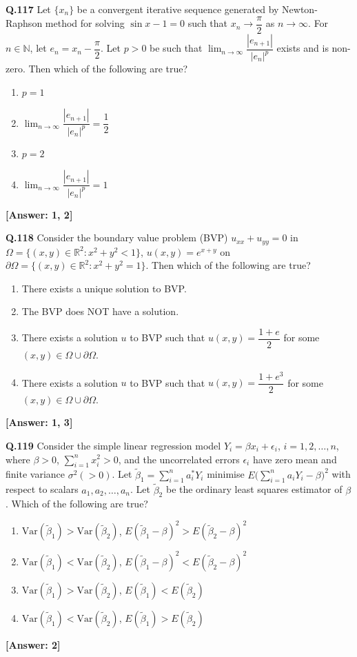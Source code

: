\documentclass[12pt,a4paper]{article}
\newcommand{\ans}[1]{\quad\textcolor{anscolor}{\textbf{[Answer: #1]}}}
\begin{document}
\textbf{Q.117} Let $\{x_n\}$ be a convergent iterative sequence generated by Newton-Raphson method for solving $\sin x-1=0$ such that $x_n\to\dfrac{\pi}{2}$ as $n\to\infty$. For $n\in\mathbb{N}$, let $e_n=x_n-\dfrac{\pi}{2}$. Let $p>0$ be such that $\lim_{n\to\infty}\dfrac{|e_{n+1}|}{|e_n|^p}$ exists and is non-zero. Then which of the following are true?
\begin{enumerate}[label=\arabic*.]
\item $p=1$
\item $\lim_{n\to\infty}\dfrac{|e_{n+1}|}{|e_n|^p}=\dfrac{1}{2}$
\item $p=2$
\item $\lim_{n\to\infty}\dfrac{|e_{n+1}|}{|e_n|^p}=1$
\end{enumerate}\ans{1, 2}

\textbf{Q.118} Consider the boundary value problem (BVP) $u_{xx}+u_{yy}=0$ in $\Omega=\{(x,y)\in\mathbb{R}^2:x^2+y^2<1\}$, $u(x,y)=e^{x+y}$ on $\partial\Omega=\{(x,y)\in\mathbb{R}^2:x^2+y^2=1\}$. Then which of the following are true?
\begin{enumerate}[label=\arabic*.]
\item There exists a unique solution to BVP.
\item The BVP does NOT have a solution.
\item There exists a solution $u$ to BVP such that $u(x,y)=\dfrac{1+e}{2}$ for some $(x,y)\in\Omega\cup\partial\Omega$.
\item There exists a solution $u$ to BVP such that $u(x,y)=\dfrac{1+e^3}{2}$ for some $(x,y)\in\Omega\cup\partial\Omega$.
\end{enumerate}\ans{1, 3}

\textbf{Q.119} Consider the simple linear regression model $Y_i=\beta x_i+\epsilon_i$, $i=1,2,\ldots,n$, where $\beta>0$, $\sum_{i=1}^nx_i^2>0$, and the uncorrelated errors $\epsilon_i$ have zero mean and finite variance $\sigma^2(>0)$. Let $\tilde{\beta}_1=\sum_{i=1}^na_i^*Y_i$ minimise $E\!\bigl(\sum_{i=1}^na_iY_i-\beta\bigr)^2$ with respect to scalars $a_1,a_2,\ldots,a_n$. Let $\tilde{\beta}_2$ be the ordinary least squares estimator of $\beta$. Which of the following are true?
\begin{enumerate}[label=\arabic*.]
\item $\text{Var}(\tilde{\beta}_1)>\text{Var}(\tilde{\beta}_2)$, $E(\tilde{\beta}_1-\beta)^2>E(\tilde{\beta}_2-\beta)^2$
\item $\text{Var}(\tilde{\beta}_1)<\text{Var}(\tilde{\beta}_2)$, $E(\tilde{\beta}_1-\beta)^2<E(\tilde{\beta}_2-\beta)^2$
\item $\text{Var}(\tilde{\beta}_1)>\text{Var}(\tilde{\beta}_2)$, $E(\tilde{\beta}_1)<E(\tilde{\beta}_2)$
\item $\text{Var}(\tilde{\beta}_1)<\text{Var}(\tilde{\beta}_2)$, $E(\tilde{\beta}_1)>E(\tilde{\beta}_2)$
\end{enumerate}\ans{2}
\end{document}
